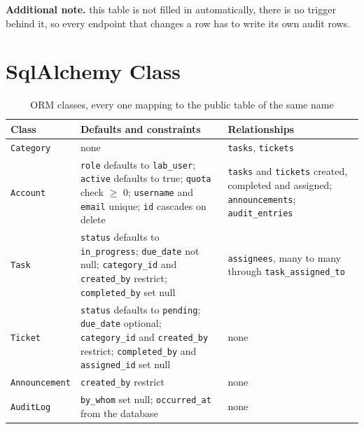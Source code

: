 \documentclass[12pt,letterpaper]{article}
\newenvironment{note}[1][Additional note]
  {\begin{notebox}\noindent\textbf{#1.}\space\ignorespaces}
  {\end{notebox}}
\begin{document}
\begin{note}
this table is not filled in automatically, there is no trigger behind it, so
every endpoint that changes a row has to write its own audit rows.
\end{note}

\section{SqlAlchemy Class}

\begin{table}[H]
  \footnotesize
  \begin{tabularx}{\textwidth}{@{}l>{\RaggedRight\arraybackslash}X>{\RaggedRight\arraybackslash}X@{}}
    \toprule
    \textbf{Class} & \textbf{Defaults and constraints} &
    \textbf{Relationships} \\
    \midrule
    \texttt{Category} & none & \texttt{tasks}, \texttt{tickets} \\
    \addlinespace[3pt]
    \texttt{Account} &
      \texttt{role} defaults to \texttt{lab\_user}; \texttt{active} defaults to
      true; \texttt{quota} check $\geq$ 0; \texttt{username} and
      \texttt{email} unique; \texttt{id} cascades on delete &
      \texttt{tasks} and \texttt{tickets} created, completed and assigned;
      \texttt{announcements}; \texttt{audit\_entries} \\
    \addlinespace[3pt]
    \texttt{Task} &
      \texttt{status} defaults to \texttt{in\_progress}; \texttt{due\_date} not
      null; \texttt{category\_id} and \texttt{created\_by} restrict;
      \texttt{completed\_by} set null &
      \texttt{assignees}, many to many through \texttt{task\_assigned\_to} \\
    \addlinespace[3pt]
    \texttt{Ticket} &
      \texttt{status} defaults to \texttt{pending}; \texttt{due\_date}
      optional; \texttt{category\_id} and \texttt{created\_by} restrict;
      \texttt{completed\_by} and \texttt{assigned\_id} set null & none \\
    \addlinespace[3pt]
    \texttt{Announcement} & \texttt{created\_by} restrict & none \\
    \addlinespace[3pt]
    \texttt{AuditLog} &
      \texttt{by\_whom} set null; \texttt{occurred\_at} from the database &
      none \\
    \bottomrule
  \end{tabularx}
  \caption{ORM classes, every one mapping to the public table of the same name}
  \label{tab:orm}
\end{table}
\end{document}
